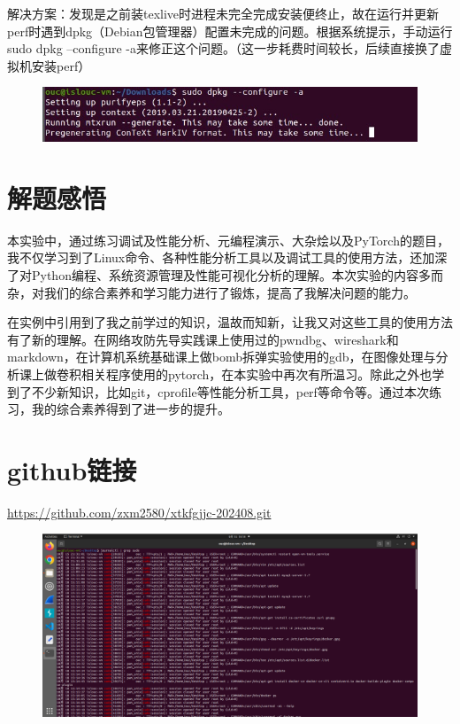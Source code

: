 \documentclass[a4paper, 12pt]{article}
\begin{document}
	解决方案：发现是之前装texlive时进程未完全完成安装便终止，故在运行并更新perf时遇到dpkg（Debian包管理器）配置未完成的问题。根据系统提示，手动运行sudo dpkg --configure -a来修正这个问题。（这一步耗费时间较长，后续直接换了虚拟机安装perf）
	
	\begin{figure}[h]
		\centering
		\includegraphics[width=1\textwidth]{101.jpg}
	\end{figure}
	
	\section{解题感悟}
	本实验中，通过练习调试及性能分析、元编程演示、大杂烩以及PyTorch的题目，我不仅学习到了Linux命令、各种性能分析工具以及调试工具的使用方法，还加深了对Python编程、系统资源管理及性能可视化分析的理解。本次实验的内容多而杂，对我们的综合素养和学习能力进行了锻炼，提高了我解决问题的能力。
	
	在实例中引用到了我之前学过的知识，温故而知新，让我又对这些工具的使用方法有了新的理解。在网络攻防先导实践课上使用过的pwndbg、wireshark和markdown，在计算机系统基础课上做bomb拆弹实验使用的gdb，在图像处理与分析课上做卷积相关程序使用的pytorch，在本实验中再次有所温习。除此之外也学到了不少新知识，比如git，cprofile等性能分析工具，perf等命令等。通过本次练习，我的综合素养得到了进一步的提升。
	
	\section{github链接}
	\underline{https://github.com/zxm2580/xtkfgjjc-202408.git}	
	
	\begin{figure}[H]
		\centering
		\includegraphics[width=1\textwidth]{001.jpg}
	\end{figure}
	
	
\end{document}
